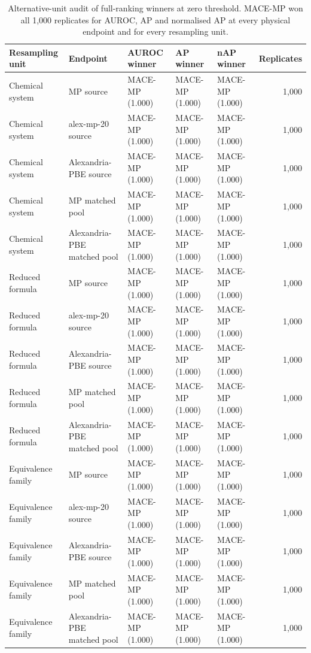 \begin{table}[H]
\centering
\sitablefont
\caption{Alternative-unit audit of full-ranking winners at zero threshold. MACE-MP won all 1,000 replicates for AUROC, AP and normalised AP at every physical endpoint and for every resampling unit.}
\label{tab:a1-global}
\begin{adjustbox}{max width=\linewidth}
\begin{tabular}{@{}lP{0.24\textwidth}lll r@{}}
\toprule
Resampling unit & Endpoint & AUROC winner & AP winner & nAP winner & Replicates \\
\midrule
Chemical system & MP source & MACE-MP (1.000) & MACE-MP (1.000) & MACE-MP (1.000) & 1,000 \\
Chemical system & alex-mp-20 source & MACE-MP (1.000) & MACE-MP (1.000) & MACE-MP (1.000) & 1,000 \\
Chemical system & Alexandria-PBE source & MACE-MP (1.000) & MACE-MP (1.000) & MACE-MP (1.000) & 1,000 \\
Chemical system & MP matched pool & MACE-MP (1.000) & MACE-MP (1.000) & MACE-MP (1.000) & 1,000 \\
Chemical system & Alexandria-PBE matched pool & MACE-MP (1.000) & MACE-MP (1.000) & MACE-MP (1.000) & 1,000 \\
Reduced formula & MP source & MACE-MP (1.000) & MACE-MP (1.000) & MACE-MP (1.000) & 1,000 \\
Reduced formula & alex-mp-20 source & MACE-MP (1.000) & MACE-MP (1.000) & MACE-MP (1.000) & 1,000 \\
Reduced formula & Alexandria-PBE source & MACE-MP (1.000) & MACE-MP (1.000) & MACE-MP (1.000) & 1,000 \\
Reduced formula & MP matched pool & MACE-MP (1.000) & MACE-MP (1.000) & MACE-MP (1.000) & 1,000 \\
Reduced formula & Alexandria-PBE matched pool & MACE-MP (1.000) & MACE-MP (1.000) & MACE-MP (1.000) & 1,000 \\
Equivalence family & MP source & MACE-MP (1.000) & MACE-MP (1.000) & MACE-MP (1.000) & 1,000 \\
Equivalence family & alex-mp-20 source & MACE-MP (1.000) & MACE-MP (1.000) & MACE-MP (1.000) & 1,000 \\
Equivalence family & Alexandria-PBE source & MACE-MP (1.000) & MACE-MP (1.000) & MACE-MP (1.000) & 1,000 \\
Equivalence family & MP matched pool & MACE-MP (1.000) & MACE-MP (1.000) & MACE-MP (1.000) & 1,000 \\
Equivalence family & Alexandria-PBE matched pool & MACE-MP (1.000) & MACE-MP (1.000) & MACE-MP (1.000) & 1,000 \\
\bottomrule
\end{tabular}
\end{adjustbox}
\end{table}

